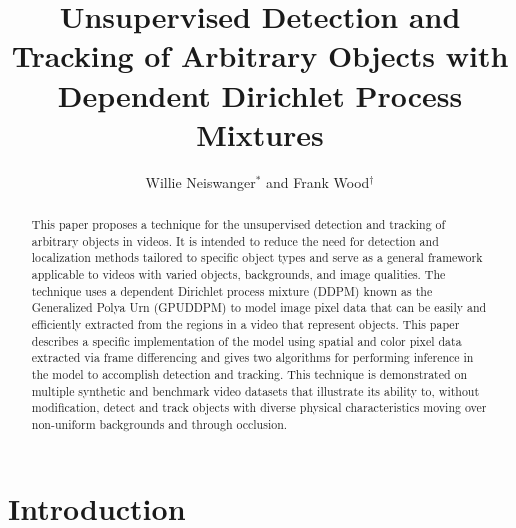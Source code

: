 \documentclass[twocolumn, final]{svjour3}
\begin{document}

\title{Unsupervised Detection and Tracking of Arbitrary Objects with Dependent Dirichlet Process Mixtures}
\author{Willie Neiswanger$^{*}$ and Frank Wood$^{\dagger}$}
\date{}  %
\maketitle



\begin{abstract}
This paper proposes a technique for the unsupervised detection and tracking of arbitrary objects in videos. It is intended to reduce the need for detection and localization methods tailored to specific object types and serve as a general framework applicable to videos with varied objects, backgrounds, and image qualities. The technique uses a dependent Dirichlet process mixture (DDPM) known as the Generalized Polya Urn (GPUDDPM) to model image pixel data that can be easily and efficiently extracted from the regions in a video that represent objects. This paper describes a specific implementation of the model using spatial and color pixel data extracted via frame differencing and gives two algorithms for performing inference in the model to accomplish detection and tracking. This technique is demonstrated on multiple synthetic and benchmark video datasets that illustrate its ability to, without modification, detect and track objects with diverse physical characteristics moving over non-uniform backgrounds and through occlusion.
\end{abstract}




\section{Introduction}
\label{sec:introduction}
\end{document}
